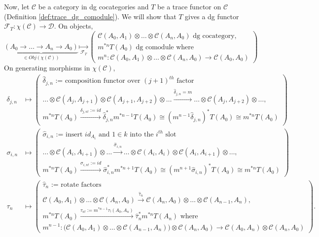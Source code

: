 Now, let $\mathcal{C}$ be a category in dg cocategories 
and $T$ be a trace functor on $\mathcal{C}$ 
(Definition \ref{def:trace_dg_comodule}). We will show 
that $T$ gives a dg functor $\mathcal{F}_T: 
\chi(\mathcal{C}) \to \mathcal{D}$. On objects,
$$
\underbrace{(A_0 \to \dots \to A_n \to A_0)}_{\in Obj(\chi(\mathcal{C}))}
\underset{\mathcal{F}_T}{\mapsto} 
\begin{pmatrix}
	\mathcal{C}(A_0,A_1) \otimes \dots \otimes \mathcal{C}(A_n,A_0)
	\textrm{ dg cocategory,}\\
	m^{*n} T(A_0) \textrm{ dg comodule where }\\
	m^n: \mathcal{C}(A_0,A_1) \otimes \dots \otimes \mathcal{C}(A_n,A_0) \to \mathcal{C}(A_0,A_0)
\end{pmatrix}
$$
On generating morphisms in $\chi(\mathcal{C})$, 
\begin{align*}
\delta_{j,n}
&\mapsto
\begin{pmatrix}
	\textrm{$\hat{\delta}_{j,n}$ := composition functor over $(j+1)^{th}$ factor}\\
	\dots \otimes \mathcal{C}(A_j,A_{j+1})
	\otimes \mathcal{C}(A_{j+1},A_{j+2}) \otimes \dots
	\xrightarrow{\hat{\delta}_{j,n}=m}
	\dots \otimes \mathcal{C}(A_j,A_{j+2}) \otimes \dots,\\
	m^{*n}T(A_0)
	\xrightarrow{\delta_{j,n!} := id}
	\hat{\delta}_{j,n}^* m^{*n-1}T(A_0)
	\cong (m^{n-1}\hat{\delta}_{j,n})^* T(A_0)
	\cong m^{*n} T(A_0)
\end{pmatrix}\\
%
\sigma_{i,n}
&\mapsto
\begin{pmatrix}
	\textrm{$\hat{\sigma}_{i,n}$ := insert $id_{A_i}$ and $1\in k$ 
	into the $i^{th}$ slot}\\
	\dots \otimes \mathcal{C}(A_i,A_{i+1})
	\otimes \dots
	\xrightarrow{\hat{\sigma}_{i,n}}
	\dots \otimes \mathcal{C}(A_i,A_i) 
	\otimes \mathcal{C}(A_i,A_{i+1}) \otimes \dots,\\
	m^{*n}T(A_0)
	\xrightarrow{\sigma_{i,n!} := id}
	\hat{\sigma}_{i,n}^* m^{*n+1}T(A_0)
	\cong (m^{n+1}\hat{\sigma}_{i,n})^* T(A_0)
	\cong m^{*n} T(A_0)
\end{pmatrix}\\
%
\tau_n
&\mapsto
\begin{pmatrix}
	\textrm{$\hat{\tau}_n$ := rotate factors}\\
	\mathcal{C}(A_0,A_1) \otimes \dots 
	\otimes \mathcal{C}(A_n,A_0)
	\xrightarrow{\hat{\tau}_n}
	\mathcal{C}(A_n,A_0) \otimes \dots 
	\otimes \mathcal{C}(A_{n-1},A_n),\\
	m^{*n}T(A_0)
	\xrightarrow{\tau_{n!} := m^{*n-1} \tau_!(A_0,A_n)}
	\hat{\tau}_n^* m^{*n}T(A_n) \textrm{ where}\\
	m^{n-1}: 
	\big( \mathcal{C}(A_0,A_1) \otimes \dots \otimes 
	\mathcal{C}(A_{n-1},A_n) \big) \otimes \mathcal{C}(A_n,A_0)
	\to \mathcal{C}(A_0,A_n) \otimes \mathcal{C}(A_n,A_0)
\end{pmatrix}.\\
\end{align*}